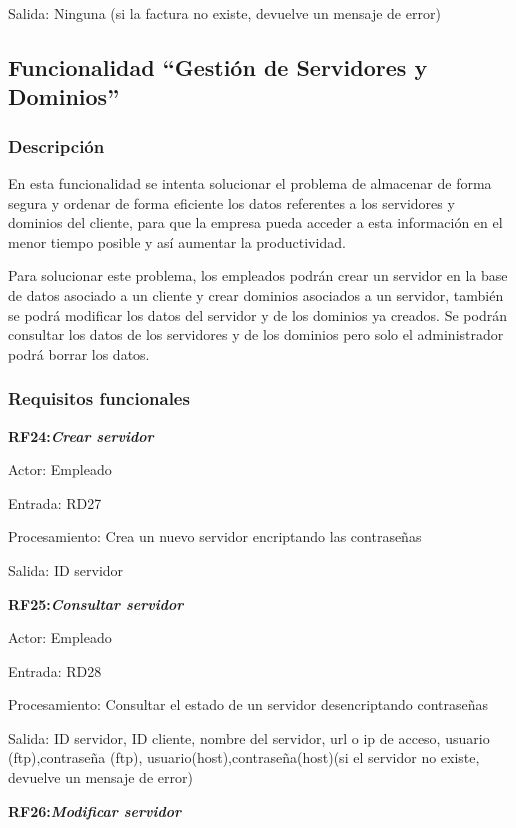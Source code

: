 \documentclass[paper=a4, fontsize=11pt, spanish]{scrartcl}
\begin{document}
	Salida: Ninguna (si la factura no existe, devuelve un mensaje de error)
    
\subsection{Funcionalidad “Gestión de Servidores y Dominios”}

\subsubsection{Descripción}
\setlength{\parindent}{3em} En esta funcionalidad se intenta solucionar el problema de almacenar de forma segura y ordenar de forma eficiente los datos referentes a los servidores y dominios del cliente, para que la empresa pueda acceder a esta información en el menor tiempo posible y así aumentar la productividad. 

Para solucionar este problema, los empleados podrán crear un servidor en la base de datos asociado a un cliente y crear dominios asociados a un servidor, también se podrá modificar los datos del servidor y de los dominios ya creados. Se podrán consultar los datos de los servidores y de los dominios pero solo el administrador podrá borrar los datos.

\subsubsection{Requisitos funcionales}
\setlength{\parindent}{0em}
\textbf{RF24:\textit{Crear servidor}}
\setlength{\parindent}{3em}

Actor: Empleado

Entrada: RD27

Procesamiento: Crea un nuevo servidor encriptando las contraseñas

Salida: ID servidor

\setlength{\parindent}{0em}
\textbf{RF25:\textit{Consultar servidor}}
\setlength{\parindent}{3em}

Actor: Empleado

Entrada: RD28

Procesamiento: Consultar el estado de un servidor desencriptando contraseñas

Salida: ID servidor, ID cliente, nombre del servidor, url o ip de acceso, usuario (ftp),contraseña (ftp), usuario(host),contraseña(host)(si el servidor no existe, devuelve un mensaje de error)

\setlength{\parindent}{0em}
\textbf{RF26:\textit{Modificar servidor}}
\setlength{\parindent}{3em}
\end{document}
